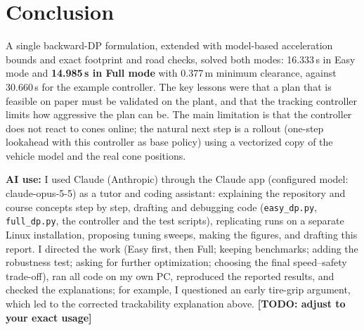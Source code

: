 \documentclass[conference]{IEEEtran}
\newcommand{\todo}[1]{\textbf{[TODO: #1]}}
\begin{document}
\section{Conclusion}
A single backward-DP formulation, extended with model-based acceleration bounds
and exact footprint and road checks, solved both modes: 16.333\,s in Easy mode
and \textbf{14.985\,s in Full mode} with 0.377\,m minimum clearance, against
30.660\,s for the example controller. The key lessons were that a plan that is
feasible on paper must be validated on the plant, and that the tracking
controller limits how aggressive the plan can be. The main limitation is that the
controller does not react to cones online; the natural next step is a rollout
(one-step lookahead with this controller as base policy) using a vectorized copy
of the vehicle model and the real cone positions.

\noindent\textbf{AI use:} I used Claude (Anthropic) through the Claude app
(configured model: claude-opus-5-5) as a tutor and coding assistant: explaining
the repository and course concepts step by step, drafting and debugging code
(\texttt{easy\_dp.py}, \texttt{full\_dp.py}, the controller and the test
scripts), replicating runs on a separate Linux installation, proposing tuning
sweeps, making the figures, and drafting this report. I directed the work (Easy
first, then Full; keeping benchmarks; adding the robustness test; asking for
further optimization; choosing the final speed--safety trade-off), ran all code
on my own PC, reproduced the reported results, and checked the explanations; for
example, I questioned an early tire-grip argument, which led to the corrected
trackability explanation above. \todo{adjust to your exact usage}

\appendix
\end{document}
